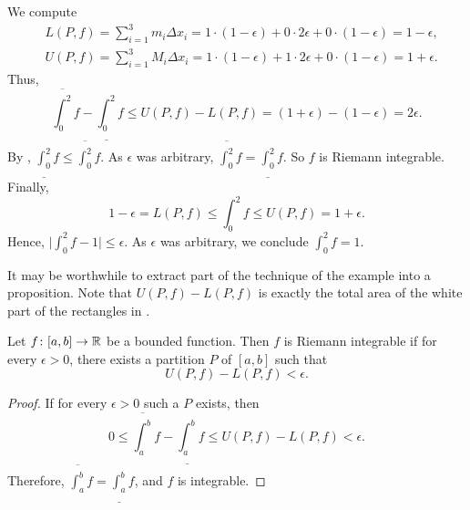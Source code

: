 \begin{example}
We compute
\begin{align*}
& L(P,f) = \sum_{i=1}^3 m_i \Delta x_i =
1 \cdot (1-\epsilon) + 0 \cdot 2\epsilon + 0 \cdot (1-\epsilon)
= 1-\epsilon , \\
& U(P,f) = \sum_{i=1}^3 M_i \Delta x_i =
1 \cdot (1-\epsilon) + 1 \cdot 2\epsilon + 0 \cdot (1-\epsilon)
= 1+\epsilon .
\end{align*}
Thus,
\begin{equation*}
\overline{\int_0^2} f - 
\underline{\int_0^2} f
\leq
U(P,f) - L(P,f)
=
(1+\epsilon)
- (1-\epsilon) = 2 \epsilon .
\end{equation*}
By , $\underline{\int_0^2} f \leq \overline{\int_0^2} f$.
As $\epsilon$ was arbitrary,
$\overline{\int_0^2} f = \underline{\int_0^2} f$.  So $f$ is Riemann
integrable.  Finally,
\begin{equation*}
1-\epsilon = L(P,f) \leq \int_0^2 f \leq U(P,f) =
1+\epsilon.
\end{equation*}
Hence, $\bigl\lvert \int_0^2 f - 1 \bigr\rvert \leq \epsilon$.  As $\epsilon$ was arbitrary,
we conclude $\int_0^2 f = 1$.
\end{example}

It may be worthwhile to extract part of the technique of the example into a
proposition.  Note that $U(P,f)-L(P,f)$ is exactly the total area of the white
part of the rectangles in .

\begin{prop}
Let $f \colon [a,b] \to {\mathbb{R}}$ be a bounded function.  Then $f$ is Riemann
integrable if for every $\epsilon > 0$, there exists a partition $P$ of
$[a,b]$ such that
\begin{equation*}
U(P,f) - L(P,f) < \epsilon .
\end{equation*}
\end{prop}

\begin{proof}
If for every $\epsilon > 0$ such a $P$ exists, then
\begin{equation*}
0 \leq
\overline{\int_a^b} f - 
\underline{\int_a^b} f
\leq
U(P,f) - L(P,f) < \epsilon .
\end{equation*}
Therefore, 
$\overline{\int_a^b} f = \underline{\int_a^b} f$, and $f$ is integrable.
\end{proof}

